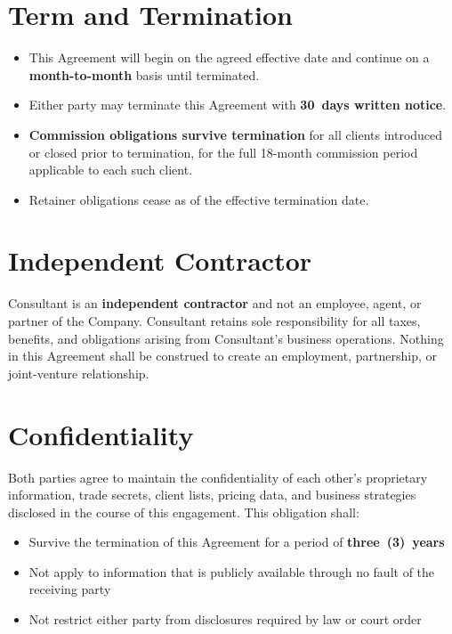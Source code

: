 \documentclass{toospoint}
\begin{document}
\section{Term and Termination}

\begin{itemize}[leftmargin=1.5em, itemsep=4pt, topsep=4pt]
  \item This Agreement will begin on the agreed effective date and continue on a
        \textbf{month-to-month} basis until terminated.
  \item Either party may terminate this Agreement with \textbf{30~days written notice}.
  \item \textbf{Commission obligations survive termination} for all clients introduced
        or closed prior to termination, for the full 18-month commission period
        applicable to each such client.
  \item Retainer obligations cease as of the effective termination date.
\end{itemize}

\section{Independent Contractor}

Consultant is an \textbf{independent contractor} and not an employee, agent, or
partner of the Company. Consultant retains sole responsibility for all taxes, benefits,
and obligations arising from Consultant's business operations. Nothing in this Agreement
shall be construed to create an employment, partnership, or joint-venture relationship.

\section{Confidentiality}

Both parties agree to maintain the confidentiality of each other's proprietary
information, trade secrets, client lists, pricing data, and business strategies
disclosed in the course of this engagement. This obligation shall:

\begin{itemize}[leftmargin=1.5em, itemsep=4pt, topsep=4pt]
  \item Survive the termination of this Agreement for a period of \textbf{three~(3)~years}
  \item Not apply to information that is publicly available through no fault of the
        receiving party
  \item Not restrict either party from disclosures required by law or court order
\end{itemize}
\end{document}
